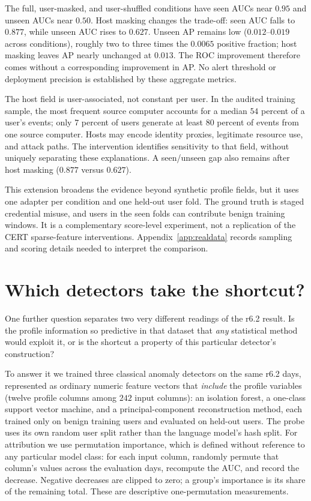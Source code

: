 \documentclass[10pt]{article} %
\begin{document}
The full, user-masked, and user-shuffled conditions have seen AUCs
near $0.95$ and unseen AUCs near $0.50$. Host masking changes the trade-off:
seen AUC falls to $0.877$, while unseen AUC rises to $0.627$. Unseen
AP remains low ($0.012$--$0.019$ across conditions), roughly two to three
times the $0.0065$ positive fraction; host masking leaves AP nearly
unchanged at $0.013$. The ROC improvement therefore comes without a
corresponding improvement in AP. No alert threshold or deployment
precision is established by these aggregate metrics.

The host field is user-associated, not constant per user. In the audited
training sample, the most frequent source computer accounts for a median
$54$ percent of a user's events; only $7$ percent of users generate at
least $80$ percent of events from one source computer. Hosts may encode
identity proxies, legitimate resource use, and attack paths. The
intervention identifies sensitivity to that field, without uniquely
separating these explanations. A seen/unseen gap also remains after
host masking ($0.877$ versus $0.627$).

This extension broadens the evidence beyond synthetic profile fields,
but it uses one adapter per condition and one held-out user fold. The
ground truth is staged credential misuse, and users in the seen folds
can contribute benign training windows. It is a complementary
score-level experiment, not a replication of the CERT sparse-feature
interventions. Appendix~\ref{app:realdata} records sampling and scoring
details needed to interpret the comparison.

\section{Which detectors take the shortcut?}
\label{sec:classical}

One further question separates two very different readings of the r6.2
result. Is the profile information so predictive in that dataset that
\emph{any} statistical method would exploit it, or is the shortcut a
property of this particular detector's construction?

To answer it we trained three classical anomaly detectors on the same
r6.2 days, represented as ordinary numeric feature vectors that
\emph{include} the profile variables (twelve profile columns among
$242$ input columns): an isolation forest, a one-class support vector
machine, and a principal-component reconstruction method, each trained
only on benign training users and evaluated on held-out users. The probe
uses its own random user split rather than the language model's hash split. For attribution we use permutation importance,
which is defined without reference to any particular model class: for
each input column, randomly permute that column's values across the
evaluation days, recompute the AUC, and record the decrease. Negative decreases are clipped to zero; a
group's importance is its share of the remaining total. These are
descriptive one-permutation measurements.
\end{document}
